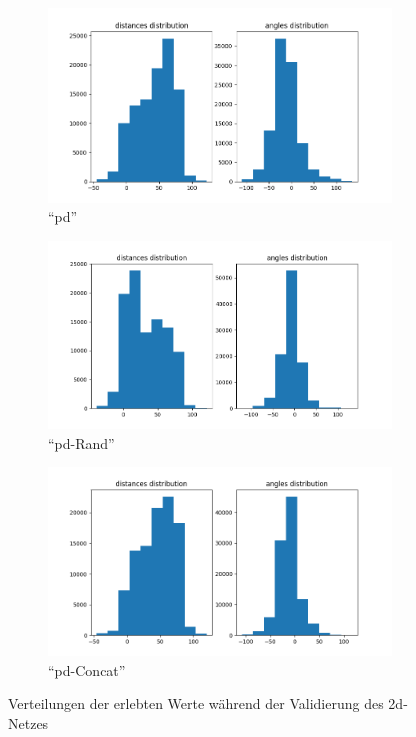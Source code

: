 \begin{figure}[H]
	\centering
	\begin{subfigure}[h]{0.5\textwidth}
		\centering
		\includegraphics[width=\linewidth]{kapitel5/images/eval/single-loss/pd-distr.png}
		\caption{``\acs{pd}''}
		\label{2d-pd-val-distr}
	\end{subfigure}%
	\begin{subfigure}[h]{0.5\textwidth}
		\centering
		\includegraphics[width=\linewidth]{kapitel5/images/eval/single-loss/pd-rand-distr.png}
		\caption{``\acs{pd}-Rand''}
		\label{2d-pd-rand-val-distr}
	\end{subfigure}
	\begin{subfigure}[h]{0.5\textwidth}
		\centering
		\includegraphics[width=\linewidth]{kapitel5/images/eval/single-loss/pd-concat-distr.png}
		\caption{``\acs{pd}-Concat''}
		\label{2d-pd-concat-val-distr}
	\end{subfigure}
	\caption{Verteilungen der erlebten Werte während der Validierung des \acs{2d}-Netzes}
	\label{2d-val-distr}
\end{figure}

